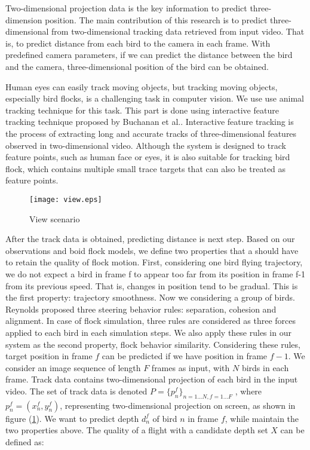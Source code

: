 Two-dimensional projection data is the key information to predict three-dimension position. The main contribution of this research is to predict three-dimensional from two-dimensional tracking data retrieved from input video. That is, to predict distance from each bird to the camera in each frame. With predefined camera parameters, if we can predict the distance between the bird and the camera, three-dimensional position of the bird can be obtained.


Human eyes can easily track moving objects, but tracking moving objects, especially bird flocks, is a challenging task in computer vision. We use use animal tracking technique for this task. This part is done using interactive feature tracking technique proposed by Buchanan et al.\cite{Tracking}. Interactive feature tracking is the process of extracting long and accurate tracks of three-dimensional features observed in two-dimensional video. Although the system is designed to track feature points, such as human face or eyes, it is also suitable for tracking bird flock, which contains multiple small trace targets that can also be treated as feature points.


\begin{figure}[h]
 \begin{center}
  \texttt{[image: view.eps]}
 \end{center}
 \caption{View scenario}
 \label{figure:view}
\end{figure}


After the track data is obtained, predicting distance is next step. Based on our observations and boid flock models, we define two properties that a should have to retain the quality of flock motion. First, considering one bird flying trajectory, we do not expect a bird in frame f to appear too far from its position in frame f-1 from its previous speed. That is, changes in position tend to be gradual. This is the first property: trajectory smoothness. Now we considering a group of birds. Reynolds proposed three steering behavior rules: separation, cohesion and alignment\cite{Boid}. In case of flock simulation, three rules are considered as three forces applied to each bird in each simulation steps. We also apply these rules in our system as the second property, flock behavior similarity. Considering these rules, target position in frame $f$ can be predicted if we have position in frame $f-1$. We consider an image sequence of length $F$ frames as input, with $N$ birds in each frame. Track data contains two-dimensional projection of each bird in the input video. The set of track data is denoted $P=\big\{p_n^f\big\}_{n=1...N,f=1...F}$ , where $p_n^f=(x_n^f, y_n^f)$, representing two-dimensional projection on screen, as shown in figure (\ref{figure:view}). We want to predict depth $d_n^f$ of bird $n$ in frame $f$, while maintain the two properties above. The quality of a flight with a candidate depth set $X$ can be defined as:


